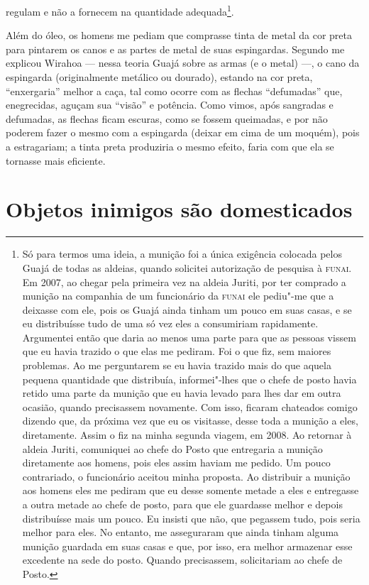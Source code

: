 regulam e não a fornecem na quantidade adequada\footnote{Só para termos
  uma ideia, a munição foi a única exigência colocada pelos Guajá de
  todas as aldeias, quando solicitei autorização de pesquisa à \textsc{funai}. Em
  2007, ao chegar pela primeira vez na aldeia Juriti, por ter comprado a
  munição na companhia de um funcionário da \textsc{funai} ele pediu"-me que a
  deixasse com ele, pois os Guajá ainda tinham um pouco em suas casas, e
  se eu distribuísse tudo de uma só vez eles a consumiriam rapidamente.
  Argumentei então que daria ao menos uma parte para que as pessoas
  vissem que eu havia trazido o que elas me pediram. Foi o que fiz, sem
  maiores problemas. Ao me perguntarem se eu havia trazido mais do que
  aquela pequena quantidade que distribuía, informei"-lhes que o chefe de
  posto havia retido uma parte da munição que eu havia levado para lhes
  dar em outra ocasião, quando precisassem novamente. Com isso, ficaram
  chateados comigo dizendo que, da próxima vez que eu os visitasse,
  desse toda a munição a eles, diretamente. Assim o fiz na minha segunda
  viagem, em 2008. Ao retornar à aldeia Juriti, comuniquei ao chefe do
  Posto que entregaria a munição diretamente aos homens, pois eles assim
  haviam me pedido. Um pouco contrariado, o funcionário aceitou minha
  proposta. Ao distribuir a munição aos homens eles me pediram que eu
  desse somente metade a eles e entregasse a outra metade ao chefe de
  posto, para que ele guardasse melhor e depois distribuísse mais um
  pouco. Eu insisti que não, que pegassem tudo, pois seria melhor para
  eles. No entanto, me asseguraram que ainda tinham alguma munição
  guardada em suas casas e que, por isso, era melhor armazenar esse
  excedente na sede do posto. Quando precisassem, solicitariam ao chefe
  de Posto.}.

Além do óleo, os homens me pediam que comprasse tinta de metal da cor
preta para pintarem os canos e as partes de metal de suas espingardas.
Segundo me explicou Wirahoa --- nessa teoria Guajá sobre as armas (e o
metal) ---, o cano da espingarda (originalmente metálico ou dourado),
estando na cor preta, ``enxergaria'' melhor a caça, tal como ocorre com as
flechas ``defumadas'' que, enegrecidas, aguçam sua ``visão'' e potência.
Como vimos, após sangradas e defumadas, as flechas ficam escuras, como
se fossem queimadas, e por não poderem fazer o mesmo com a espingarda
(deixar em cima de um moquém), pois a estragariam; a tinta preta
produziria o mesmo efeito, faria com que ela se tornasse mais eficiente.

\section{Objetos inimigos são domesticados}

